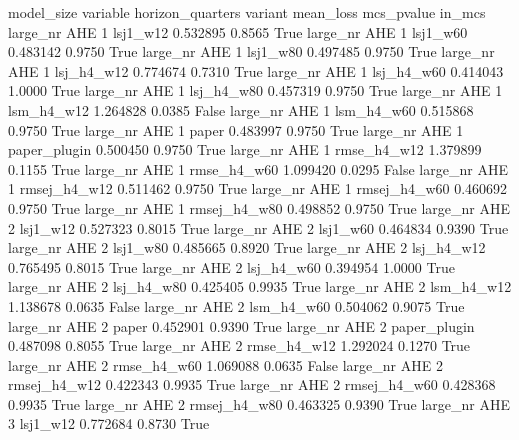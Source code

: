 model_size variable  horizon_quarters      variant   mean_loss  mcs_pvalue  in_mcs
  large_nr      AHE                 1     lsj1_w12    0.532895      0.8565    True
  large_nr      AHE                 1     lsj1_w60    0.483142      0.9750    True
  large_nr      AHE                 1     lsj1_w80    0.497485      0.9750    True
  large_nr      AHE                 1   lsj_h4_w12    0.774674      0.7310    True
  large_nr      AHE                 1   lsj_h4_w60    0.414043      1.0000    True
  large_nr      AHE                 1   lsj_h4_w80    0.457319      0.9750    True
  large_nr      AHE                 1   lsm_h4_w12    1.264828      0.0385   False
  large_nr      AHE                 1   lsm_h4_w60    0.515868      0.9750    True
  large_nr      AHE                 1        paper    0.483997      0.9750    True
  large_nr      AHE                 1 paper_plugin    0.500450      0.9750    True
  large_nr      AHE                 1  rmse_h4_w12    1.379899      0.1155    True
  large_nr      AHE                 1  rmse_h4_w60    1.099420      0.0295   False
  large_nr      AHE                 1 rmsej_h4_w12    0.511462      0.9750    True
  large_nr      AHE                 1 rmsej_h4_w60    0.460692      0.9750    True
  large_nr      AHE                 1 rmsej_h4_w80    0.498852      0.9750    True
  large_nr      AHE                 2     lsj1_w12    0.527323      0.8015    True
  large_nr      AHE                 2     lsj1_w60    0.464834      0.9390    True
  large_nr      AHE                 2     lsj1_w80    0.485665      0.8920    True
  large_nr      AHE                 2   lsj_h4_w12    0.765495      0.8015    True
  large_nr      AHE                 2   lsj_h4_w60    0.394954      1.0000    True
  large_nr      AHE                 2   lsj_h4_w80    0.425405      0.9935    True
  large_nr      AHE                 2   lsm_h4_w12    1.138678      0.0635   False
  large_nr      AHE                 2   lsm_h4_w60    0.504062      0.9075    True
  large_nr      AHE                 2        paper    0.452901      0.9390    True
  large_nr      AHE                 2 paper_plugin    0.487098      0.8055    True
  large_nr      AHE                 2  rmse_h4_w12    1.292024      0.1270    True
  large_nr      AHE                 2  rmse_h4_w60    1.069088      0.0635   False
  large_nr      AHE                 2 rmsej_h4_w12    0.422343      0.9935    True
  large_nr      AHE                 2 rmsej_h4_w60    0.428368      0.9935    True
  large_nr      AHE                 2 rmsej_h4_w80    0.463325      0.9390    True
  large_nr      AHE                 3     lsj1_w12    0.772684      0.8730    True
